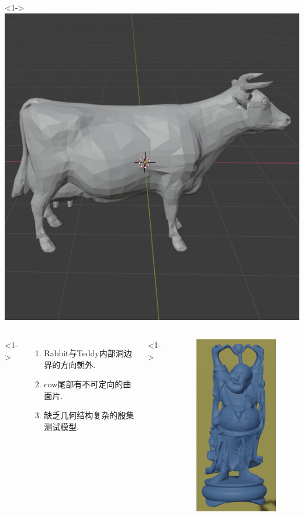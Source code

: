 \documentclass[UTF8]{ctexbeamer}	%
\theoremstyle{plain}
\theoremstyle{definition}
\theoremstyle{remark}
\numberwithin{equation}{section}
\begin{document}
\begin{frame}
\begin{columns}
        <1->
        \includegraphics[width = \textwidth]{fig/wrong3.png}
    \end{columns}
    \begin{columns}
        <1->
    \begin{enumerate}
        \item Rabbit与Teddy内部洞边界的方向朝外.
        \item cow尾部有不可定向的曲面片.
        \item 缺乏几何结构复杂的殷集测试模型.
    \end{enumerate}
    <1->
    \begin{figure}[htbp]
        \flushright
        \includegraphics[width = 0.4
        \textwidth]{fig/wrong4.png}
    \end{figure}
    \end{columns}


\end{frame}
\end{document}
